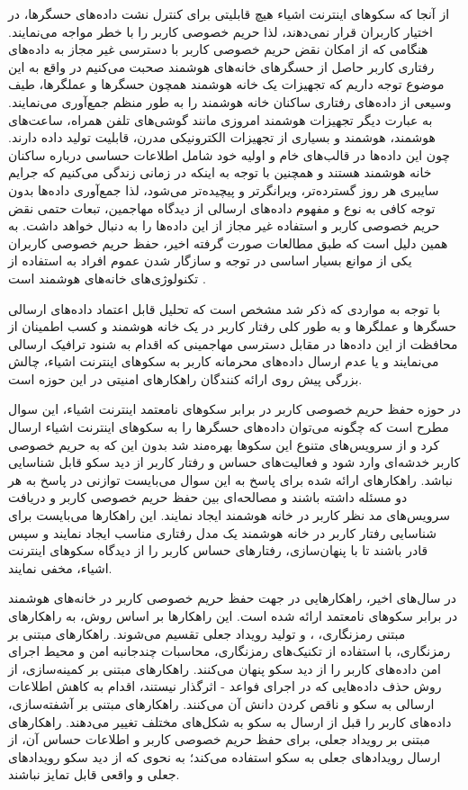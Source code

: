 از آنجا که ﺳﮑﻮﻫﺎی اینترنت اشیاء ﻫﯿﭻ ﻗﺎﺑﻠﯿﺘﯽ ﺑﺮای ﮐﻨﺘﺮل ﻧﺸﺖ دادهﻫﺎی حسگرها، در اﺧﺘﯿﺎر ﮐﺎرﺑﺮان ﻗﺮار ﻧﻤﯽدﻫند، لذا حریم خصوصی کاربر را با خطر مواجه می‌نمایند. هنگامی که از امکان نقض حریم خصوصی کاربر با دسترسی غیر مجاز به داده‌های رفتاری کاربر حاصل از حسگرهای خانه‌های هوشمند صحبت می‌کنیم در واقع به این موضوع توجه داریم که تجهیزات یک خانه هوشمند همچون حسگرها و عملگرها، طیف وسیعی از داده‌های رفتاری ساکنان خانه هوشمند را به طور منظم جمع‌آوری می‌نمایند. به عبارت دیگر تجهیزات هوشمند امروزی مانند گوشی‌های تلفن همراه، ساعت‌های هوشمند،  هوشمند و بسیاری از تجهیزات الکترونیکی مدرن، قابلیت تولید داده دارند. چون این داده‌ها در قالب‌های خام و اولیه خود شامل اطلاعات حساسی درباره ساکنان خانه هوشمند هستند و همچنین با توجه به اينکه در زمانی زندگی می‌کنیم که جرایم سایبری هر روز گسترده‌تر، ويرانگرتر و پيچيده‌تر می‌شود، لذا جمع‌آوری داده‌ها بدون توجه کافی به نوع و مفهوم داده‌های ارسالی از دیدگاه مهاجمین، تبعات حتمی نقض حریم خصوصی کاربر و استفاده غیر مجاز از این داده‌ها را به دنبال خواهد داشت. به همین دلیل است که طبق مطالعات صورت گرفته اخیر، حفظ حریم خصوصی کاربران یکی از موانع بسیار اساسی در توجه و سازگار شدن عموم افراد به استفاده از تکنولوژی‌های خانه‌های هوشمند است \cite{x13}. 

با توجه به مواردی که ذکر شد مشخص است که تحلیل قابل اعتماد داده‌های ارسالی حسگرها و عملگرها و به طور کلی رفتار کاربر در یک خانه هوشمند و کسب اطمینان از محافظت از این داده‌ها در مقابل دسترسی مهاجمینی که اقدام به شنود ترافیک ارسالی می‌نمایند و یا عدم ارسال داده‌های محرمانه کاربر به سکوهای اینترنت اشیاء، چالش بزرگی پیش روی ارائه کنندگان راهکارهای امنیتی در این حوزه است.

در حوزه حفظ حریم خصوصی کاربر در برابر سکوهای نامعتمد اینترنت اشیاء، این سوال مطرح است که چگونه می‌توان داده‌های حسگرها را به سکوهای اینترنت اشیاء ارسال کرد و از سرویس‌های متنوع این سکوها بهره‌مند شد بدون این که به حریم خصوصی کاربر خدشه‌ای وارد شود و فعالیت‌های حساس و رفتار کاربر از دید سکو قابل شناسایی نباشد. راهکارهای ارائه شده برای پاسخ به اين سوال می‌بایست توازنی در پاسخ به هر دو مسئله داشته باشند و مصالحه‌ای بین حفظ حریم خصوصی کاربر و دریافت سرویس‌های مد نظر کاربر در خانه هوشمند ایجاد نمایند. این راهکارها می‌بایست برای شناسایی رفتار کاربر در خانه هوشمند یک مدل رفتاری مناسب ایجاد نمایند و سپس قادر باشند تا با پنهان‌سازی، رفتارهای حساس کاربر را از دیدگاه سکوهای اینترنت اشیاء، مخفی نمایند. 

در سال‌های اخیر، راهکارهایی در جهت حفظ حریم خصوصی کاربر در خانه‌های هوشمند در برابر سکوهای نامعتمد ارائه شده است. این راهکارها بر اساس روش، به راهکارهای مبتنی رمزنگاری، ،  و تولید رویداد جعلی تقسیم می‌شوند. راهکارهای مبتنی بر رمزنگاری، با استفاده از تکنیک‌های رمزنگاری، محاسبات چندجانبه امن و محیط اجرای امن داده‌های کاربر را از دید سکو پنهان می‌کنند. راهکارهای مبتنی بر کمینه‌سازی، از روش حذف داده‌هایی که در اجرای فواعد - اثرگذار نیستند، اقدام به کاهش اطلاعات ارسالی به سکو و ناقص کردن دانش آن می‌کنند. راهکارهای مبتنی بر آشفته‌سازی، داده‌های کاربر را قبل از ارسال به سکو به شکل‌های مختلف تغییر می‌دهند. راهکارهای مبتنی بر رویداد جعلی، برای حفظ حریم خصوصی کاربر و اطلاعات حساس آن، از ارسال رویدادهای جعلی به سکو استفاده می‌کند؛ به نحوی که از دید سکو رویدادهای جعلی و واقعی قابل تمایز نباشند.

